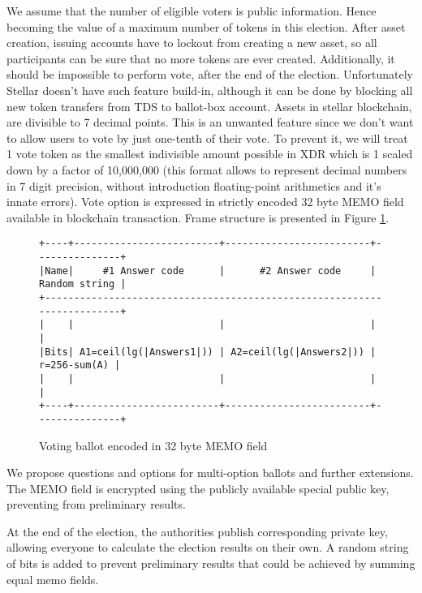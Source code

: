 \documentclass[runningheads]{llncs}
\begin{document}
We assume that the number of eligible voters is public information. Hence becoming the value of a maximum number of tokens in this election. After asset creation, issuing accounts have to lockout from creating a new asset, so all participants can be sure that no more tokens are ever created. Additionally, it should be impossible to perform vote, after the end of the election. Unfortunately Stellar doesn’t have such feature build-in, although it can be done by blocking all new token transfers from TDS to ballot-box account.
Assets in stellar blockchain, are divisible to 7 decimal points. This is an unwanted feature since we don’t want to allow users to vote by just one-tenth of their vote. To prevent it, we will treat 1 vote token as the smallest indivisible amount possible in XDR which is 1 scaled down by a factor of 10,000,000 (this format allows to represent decimal numbers in 7 digit precision, without introduction floating-point arithmetics and it’s innate errors).
Vote option is expressed in strictly encoded 32 byte MEMO field available in blockchain transaction. Frame structure is presented in Figure \ref{fig:ballot-encoding}. 

\begin{figure}
\begin{verbatim}
+----+-------------------------+-------------------------+---------------+
|Name|     #1 Answer code      |      #2 Answer code     | Random string |
+------------------------------------------------------------------------+
|    |                         |                         |               |
|Bits| A1=ceil(lg(|Answers1|)) | A2=ceil(lg(|Answers2|)) |  r=256-sum(A) |
|    |                         |                         |               |
+----+-------------------------+-------------------------+---------------+

\end{verbatim}
\caption{Voting ballot encoded in 32 byte MEMO field}
\label{fig:ballot-encoding}
\end{figure} 

We propose questions and options for multi-option ballots and further extensions.
The MEMO field is encrypted using the publicly available special public key,
preventing from preliminary results. %

At the end of the election, the authorities publish corresponding private key, allowing everyone to calculate the election results on their own. A random string of bits is added to prevent preliminary results that could be achieved by summing equal memo fields.
\end{document}
